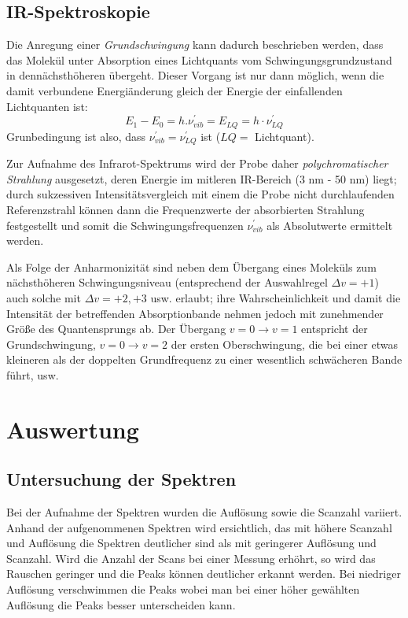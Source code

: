 \documentclass[12pt]{article}
\begin{document}
\subsection{IR-Spektroskopie}
Die Anregung einer \textit{Grundschwingung} kann dadurch beschrieben werden,
dass das Molekül unter Absorption eines Lichtquants vom Schwingungsgrundzustand in dennächsthöheren übergeht.
Dieser Vorgang ist nur dann möglich, wenn die damit verbundene Energiänderung gleich der Energie der einfallenden Lichtquanten ist:
\begin{equation}
    E _1 - E_0 = h. \nu ^{'}_{vib} = E _{LQ} = h \cdot \nu ^{'}_{LQ}
\end{equation}
Grunbedingung ist also, dass $\nu ^{'}_{vib} = \nu ^{'}_{LQ} $ ist ($LQ =$ Lichtquant). \par
Zur Aufnahme des Infrarot-Spektrums wird der Probe daher \textit{polychromatischer Strahlung} ausgesetzt,
deren Energie im mitleren IR-Bereich (3 \si{\nano\meter} - 50 \si{\nano\meter}) liegt; durch sukzessiven
Intensitätsvergleich mit einem die Probe nicht durchlaufenden Referenzstrahl können dann die Frequenzwerte
der absorbierten Strahlung festgestellt und somit die Schwingungsfrequenzen $\nu ^{'}_{vib} $ als Absolutwerte
ermittelt werden. \par
Als Folge der Anharmonizität sind neben dem Übergang eines Moleküls zum nächsthöheren Schwingungsniveau
(entsprechend der Auswahlregel $ \Delta v = +1$) auch solche mit $ \Delta v = +2, +3$ usw. erlaubt;
ihre Wahrscheinlichkeit und damit die Intensität der betreffenden Absorptionbande nehmen
jedoch mit zunehmender Größe des Quantensprungs ab. Der Übergang $v =0 \rightarrow v =1$ entspricht der Grundschwingung,
$ v =0 \rightarrow v=2 $ der ersten Oberschwingung, die bei einer etwas kleineren als der doppelten Grundfrequenz
zu einer wesentlich schwächeren Bande führt, usw.

\section{Auswertung}

\subsection{Untersuchung der Spektren}

Bei der Aufnahme der Spektren wurden die Auflösung sowie die Scanzahl variiert. Anhand der aufgenommenen Spektren wird ersichtlich, das mit höhere Scanzahl und Auflösung die Spektren deutlicher sind als mit geringerer Auflösung und Scanzahl. 
Wird die Anzahl der Scans bei einer Messung erhöhrt, so wird das Rauschen geringer und die Peaks können deutlicher erkannt werden. Bei niedriger Auflösung verschwimmen die Peaks wobei man bei einer höher gewählten Auflösung die Peaks besser unterscheiden kann.
\end{document}
